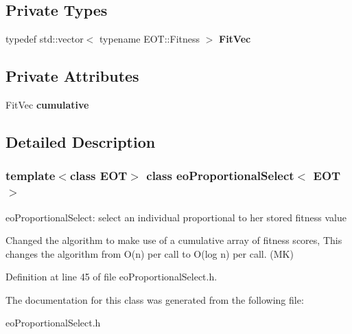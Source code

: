 \subsection*{Private Types}
\begin{CompactItemize}
\item 
typedef std::vector$<$ typename EOT::Fitness $>$ {\bf Fit\-Vec}\label{classeo_proportional_select_y0}

\end{CompactItemize}
\subsection*{Private Attributes}
\begin{CompactItemize}
\item 
Fit\-Vec {\bf cumulative}\label{classeo_proportional_select_r0}

\end{CompactItemize}


\subsection{Detailed Description}
\subsubsection*{template$<$class EOT$>$ class eo\-Proportional\-Select$<$ EOT $>$}

eo\-Proportional\-Select: select an individual proportional to her stored fitness value 

Changed the algorithm to make use of a cumulative array of fitness scores, This changes the algorithm from O(n) per call to O(log n) per call. (MK) 



Definition at line 45 of file eo\-Proportional\-Select.h.

The documentation for this class was generated from the following file:\begin{CompactItemize}
\item 
eo\-Proportional\-Select.h\end{CompactItemize}
